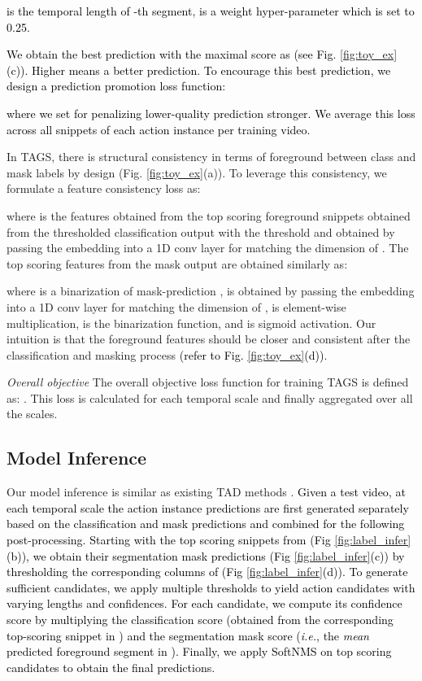 \documentclass[runningheads]{llncs}
\newcommand{\ie}{\textit{i.e.}}
\newcommand{\shortmodelname}{TAGS}
\begin{document}
\textcolor{black}{ is the temporal length of -th segment,  is a weight hyper-parameter which is set to 0.25.}
\textcolor{black}{
We obtain the best prediction with the maximal score as 
 (see Fig. \ref{fig:toy_ex}(c)).
Higher  means 
a better prediction.
To encourage this best prediction,
we design a prediction promotion loss function:

where we set  for penalizing lower-quality prediction stronger.
We average this loss across all snippets of each action instance per training video.
}

{\color{black}
In {\shortmodelname}, there is structural consistency {in terms of foreground} between class and mask labels by design (Fig. \ref{fig:toy_ex}(a)).
To leverage this consistency, we formulate a feature consistency loss as:

where  is the features obtained from the top scoring foreground snippets obtained from the thresholded classification output 
with  the threshold and  obtained by passing the embedding  into a 1D conv layer for matching the dimension of .
The top scoring features from the mask output  are obtained similarly as:

where  is a binarization of mask-prediction ,  is obtained by passing the embedding  into a 1D conv layer for matching the dimension of ,  is element-wise multiplication,  is the binarization function, and  is sigmoid activation.
Our intuition is that the foreground features should be closer and consistent after the classification and masking process \textcolor{black}{(refer to Fig. \ref{fig:toy_ex}(d))}.
}

\noindent\textit{Overall objective } 
The overall objective loss function for training {\shortmodelname} is defined as:
. This loss is calculated for each temporal scale  and finally aggregated over all the scales.


\subsection{Model Inference}
Our model inference is similar as existing TAD methods \cite{lin2019bmn,xu2020g}.
\textcolor{black}{Given a test video, at each temporal scale  the action instance predictions are first generated separately based on the classification  and mask  predictions and combined for the following post-processing.
Starting with the top scoring snippets from  (Fig \ref{fig:label_infer}(b)),
we obtain their segmentation mask predictions (Fig \ref{fig:label_infer}(c))
by thresholding the corresponding columns of  (Fig \ref{fig:label_infer}(d)).
To generate sufficient candidates,
we apply multiple thresholds 
to yield action candidates with varying lengths and confidences.
For each candidate, we compute its confidence score 
by multiplying the classification score \textcolor{black}{(obtained from the corresponding top-scoring snippet in )}
and the \textcolor{black}{segmentation mask score (\ie,  the {\em mean} predicted foreground segment in )}.
Finally, we apply SoftNMS \cite{bodla2017soft} on top scoring candidates to obtain the final predictions.}
\end{document}
